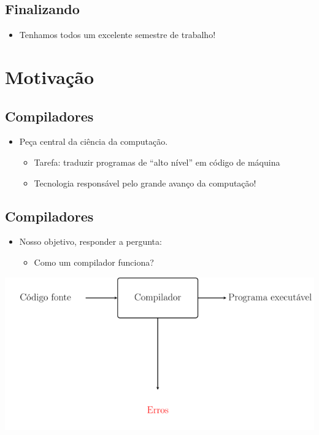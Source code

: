 \documentclass[11pt]{article}
\begin{document}
\subsection*{Finalizando}
\label{sec:orga30a90e}

\begin{itemize}
\item Tenhamos todos um excelente semestre de trabalho!
\end{itemize}
\section*{Motivação}
\label{sec:org8189118}

\subsection*{Compiladores}
\label{sec:orgeb6e0cc}

\begin{itemize}
\item Peça central da ciência da computação.
\begin{itemize}
\item Tarefa: traduzir programas de ``alto nível'' em código de máquina
\item Tecnologia responsável pelo grande avanço da computação!
\end{itemize}
\end{itemize}
\subsection*{Compiladores}
\label{sec:org549bf61}

\begin{itemize}
\item Nosso objetivo, responder a pergunta:
\begin{itemize}
\item Como um compilador funciona?
\end{itemize}
\end{itemize}

\begin{center}
\includegraphics[width=.9\linewidth]{./imgs/image1.png}
\end{center}
\end{document}
